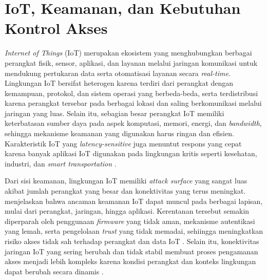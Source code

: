 \section{IoT, Keamanan, dan Kebutuhan Kontrol Akses}

\textit{Internet of Things} (IoT) merupakan ekosistem yang menghubungkan berbagai perangkat fisik, sensor, aplikasi, dan layanan melalui jaringan komunikasi untuk mendukung pertukaran data serta otomatisasi layanan secara \textit{real-time}. Lingkungan IoT bersifat heterogen karena terdiri dari perangkat dengan kemampuan, protokol, dan sistem operasi yang berbeda-beda, serta terdistribusi karena perangkat tersebar pada berbagai lokasi dan saling berkomunikasi melalui jaringan yang luas. Selain itu, sebagian besar perangkat IoT memiliki keterbatasan sumber daya pada aspek komputasi, memori, energi, dan \textit{bandwidth}, sehingga mekanisme keamanan yang digunakan harus ringan dan efisien. Karakteristik IoT yang \textit{latency-sensitive} juga menuntut respons yang cepat karena banyak aplikasi IoT digunakan pada lingkungan kritis seperti kesehatan, industri, dan \textit{smart transportation} \parencite{kokila_authentication_2025}.

Dari sisi keamanan, lingkungan IoT memiliki \textit{attack surface} yang sangat luas akibat jumlah perangkat yang besar dan konektivitas yang terus meningkat. \textcite{williams_survey_2022} menjelaskan bahwa ancaman keamanan IoT dapat muncul pada berbagai lapisan, mulai dari perangkat, jaringan, hingga aplikasi. Kerentanan tersebut semakin diperparah oleh penggunaan \textit{firmware} yang tidak aman, mekanisme autentikasi yang lemah, serta pengelolaan \textit{trust} yang tidak memadai, sehiingga meningkatkan risiko akses tidak sah terhadap perangkat dan data IoT \parencite{altaibek_survey_2025}. Selain itu, konektivitas jaringan IoT yang sering berubah dan tidak stabil membuat proses pengamanan akses menjadi lebih kompleks karena kondisi perangkat dan konteks lingkungan dapat berubah secara dinamis \parencite{krishnasrija_dynamic_2026}.

